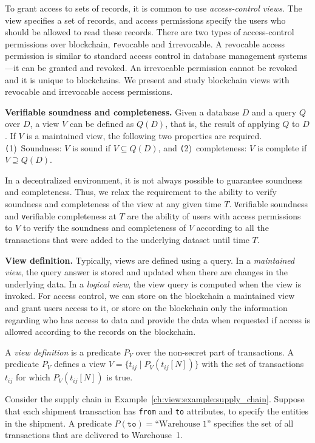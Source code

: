 To grant access to sets of records, it is common to use {\em access-control views}. The view specifies a set of records, and access permissions specify the users who should be allowed to read these records. There are two types of access-control permissions over blockchain, {\texttt revocable\/} and {\texttt irrevocable}. A revocable access permission is similar to standard access control in database management systems---it can be granted and revoked. 
An irrevocable permission cannot be revoked  and it is unique to blockchains. We present and study blockchain views with revocable and irrevocable access permissions.



\medskip
\noindent
\textbf{Verifiable soundness and completeness.}
Given a database $D$ and a query $Q$ over $D$, a view $V$ can be defined as $Q(D)$, that is, the result of applying $Q$ to $D$. If $V$ is a maintained view, the following two properties are required.
{\texttt (1)~Soundness\/}: $V$ is sound if $V\subseteq Q(D)$, and 
{\texttt (2)~completeness\/}: $V$ is complete if $V\supseteq Q(D)$. 

In a decentralized environment, it is not always possible to guarantee soundness and completeness. Thus, we relax the requirement to the ability to verify soundness and completeness of the view at any given time $T$. {\texttt Verifiable soundness\/} and {\texttt verifiable completeness\/} at $T$ are the ability of users with access permissions to $V$ to verify the soundness and completeness of $V$ according to all the transactions that were added to the underlying dataset until time $T$.   


\medskip
\textbf{View definition.}
Typically, views are defined using a query. In a {\em maintained view}, the query answer is stored and updated when there are changes in the underlying data. In a {\em logical view}, the view query is computed when the view is invoked. For access control, we can store on the blockchain a maintained view and grant users access to it, or store on the blockchain only the information regarding who has access to data and provide the data when requested if access is allowed according to the records on the blockchain.

A {\em view definition\/} is a predicate $P_V$ over the non-secret part of transactions. A predicate $P_V$ defines a view $V=\{t_{ij} \mid P_V(t_{ij}[N])\}$ with the set of transactions $t_{ij}$ for which $P_V(t_{ij}[N])$ is true. 

\begin{example}
\label{ch:view:example:view_def}
Consider the supply chain in Example~\ref{ch:view:example:supply_chain}. 
Suppose that each shipment transaction has {\texttt{from}} and {\texttt{to}} attributes, to specify the entities in the shipment. A predicate $P(\texttt{to}) = \textrm{``Warehouse~1''}$ specifies the set of all transactions that are delivered to Warehouse~1. 
\end{example}

